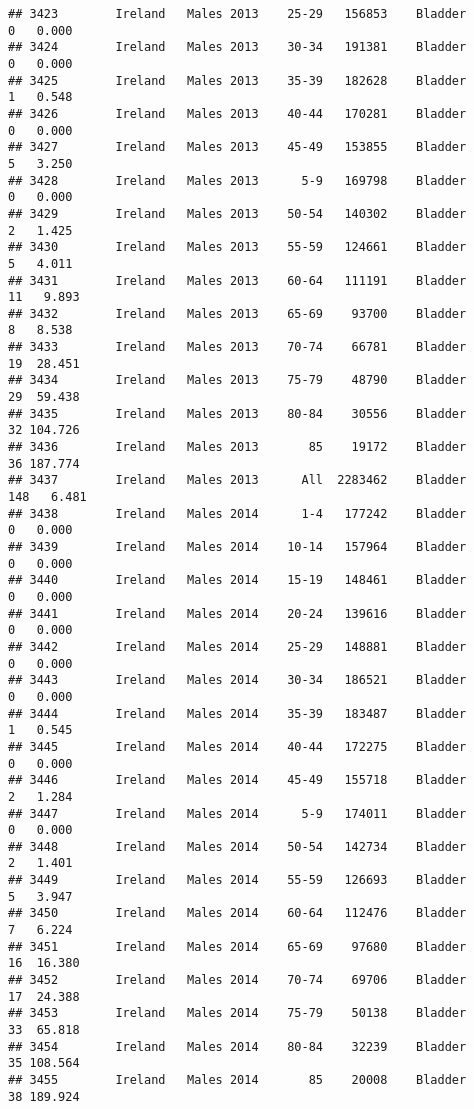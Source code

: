 \documentclass[
]{article}
\begin{document}
\begin{verbatim}
## 3423        Ireland   Males 2013    25-29   156853    Bladder      0   0.000
## 3424        Ireland   Males 2013    30-34   191381    Bladder      0   0.000
## 3425        Ireland   Males 2013    35-39   182628    Bladder      1   0.548
## 3426        Ireland   Males 2013    40-44   170281    Bladder      0   0.000
## 3427        Ireland   Males 2013    45-49   153855    Bladder      5   3.250
## 3428        Ireland   Males 2013      5-9   169798    Bladder      0   0.000
## 3429        Ireland   Males 2013    50-54   140302    Bladder      2   1.425
## 3430        Ireland   Males 2013    55-59   124661    Bladder      5   4.011
## 3431        Ireland   Males 2013    60-64   111191    Bladder     11   9.893
## 3432        Ireland   Males 2013    65-69    93700    Bladder      8   8.538
## 3433        Ireland   Males 2013    70-74    66781    Bladder     19  28.451
## 3434        Ireland   Males 2013    75-79    48790    Bladder     29  59.438
## 3435        Ireland   Males 2013    80-84    30556    Bladder     32 104.726
## 3436        Ireland   Males 2013       85    19172    Bladder     36 187.774
## 3437        Ireland   Males 2013      All  2283462    Bladder    148   6.481
## 3438        Ireland   Males 2014      1-4   177242    Bladder      0   0.000
## 3439        Ireland   Males 2014    10-14   157964    Bladder      0   0.000
## 3440        Ireland   Males 2014    15-19   148461    Bladder      0   0.000
## 3441        Ireland   Males 2014    20-24   139616    Bladder      0   0.000
## 3442        Ireland   Males 2014    25-29   148881    Bladder      0   0.000
## 3443        Ireland   Males 2014    30-34   186521    Bladder      0   0.000
## 3444        Ireland   Males 2014    35-39   183487    Bladder      1   0.545
## 3445        Ireland   Males 2014    40-44   172275    Bladder      0   0.000
## 3446        Ireland   Males 2014    45-49   155718    Bladder      2   1.284
## 3447        Ireland   Males 2014      5-9   174011    Bladder      0   0.000
## 3448        Ireland   Males 2014    50-54   142734    Bladder      2   1.401
## 3449        Ireland   Males 2014    55-59   126693    Bladder      5   3.947
## 3450        Ireland   Males 2014    60-64   112476    Bladder      7   6.224
## 3451        Ireland   Males 2014    65-69    97680    Bladder     16  16.380
## 3452        Ireland   Males 2014    70-74    69706    Bladder     17  24.388
## 3453        Ireland   Males 2014    75-79    50138    Bladder     33  65.818
## 3454        Ireland   Males 2014    80-84    32239    Bladder     35 108.564
## 3455        Ireland   Males 2014       85    20008    Bladder     38 189.924

\end{verbatim}
\end{document}
